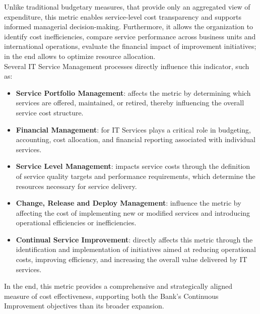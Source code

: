 Unlike traditional budgetary measures, that provide only an aggregated view of expenditure, this metric enables service-level cost transparency and supports informed managerial decision-making.
Furthermore, it allows the organization to identify cost inefficiencies, compare service performance across business units and international operations, evaluate the financial impact of improvement initiatives; in the end allows to optimize resource allocation. \\


Several IT Service Management processes directly influence this indicator, such as:
\begin{itemize}
    \item \textbf{Service Portfolio Management}: affects the metric by determining which services are offered, maintained, or retired, thereby influencing the overall service cost structure.
    \item \textbf{Financial Management}: for IT Services plays a critical role in budgeting, accounting, cost allocation, and financial reporting associated with individual services.
    \item \textbf{Service Level Management}: impacts service costs through the definition of service quality targets and performance requirements, which determine the resources necessary for service delivery.
    \item \textbf{Change, Release and Deploy Management}: influence the metric by affecting the cost of implementing new or modified services and introducing operational efficiencies or inefficiencies. 
    \item \textbf{Continual Service Improvement}: directly affects this metric through the identification and implementation of initiatives aimed at reducing operational costs, improving efficiency, and increasing the overall value delivered by IT services.

\end{itemize}
   

In the end, this metric provides a comprehensive and strategically aligned measure of cost effectiveness, supporting both the Bank's Continuous Improvement objectives than its broader expansion.

